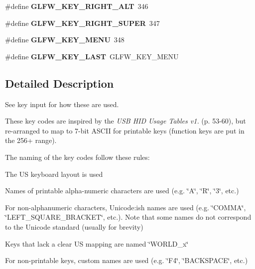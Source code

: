 \begin{DoxyCompactItemize}
\mbox{\label{group__keys_ga687b38009131cfdd07a8d05fff8fa446}} 
\#define {\bfseries G\+L\+F\+W\+\_\+\+K\+E\+Y\+\_\+\+R\+I\+G\+H\+T\+\_\+\+A\+LT}~346
\item 
\mbox{\label{group__keys_gad4547a3e8e247594acb60423fe6502db}} 
\#define {\bfseries G\+L\+F\+W\+\_\+\+K\+E\+Y\+\_\+\+R\+I\+G\+H\+T\+\_\+\+S\+U\+P\+ER}~347
\item 
\mbox{\label{group__keys_ga9845be48a745fc232045c9ec174d8820}} 
\#define {\bfseries G\+L\+F\+W\+\_\+\+K\+E\+Y\+\_\+\+M\+E\+NU}~348
\item 
\mbox{\label{group__keys_ga442cbaef7bfb9a4ba13594dd7fbf2789}} 
\#define {\bfseries G\+L\+F\+W\+\_\+\+K\+E\+Y\+\_\+\+L\+A\+ST}~G\+L\+F\+W\+\_\+\+K\+E\+Y\+\_\+\+M\+E\+NU
\end{DoxyCompactItemize}


\subsection{Detailed Description}
See key input for how these are used.

These key codes are inspired by the {\itshape U\+SB H\+ID Usage Tables v1.} (p. 53-\/60), but re-\/arranged to map to 7-\/bit A\+S\+C\+II for printable keys (function keys are put in the 256+ range).

The naming of the key codes follow these rules\+:
\begin{DoxyItemize}
\item The US keyboard layout is used
\item Names of printable alpha-\/numeric characters are used (e.\+g. \char`\"{}\+A\char`\"{}, \char`\"{}\+R\char`\"{}, \char`\"{}3\char`\"{}, etc.)
\item For non-\/alphanumeric characters, Unicode\+:ish names are used (e.\+g. \char`\"{}\+C\+O\+M\+M\+A\char`\"{}, \char`\"{}\+L\+E\+F\+T\+\_\+\+S\+Q\+U\+A\+R\+E\+\_\+\+B\+R\+A\+C\+K\+E\+T\char`\"{}, etc.). Note that some names do not correspond to the Unicode standard (usually for brevity)
\item Keys that lack a clear US mapping are named \char`\"{}\+W\+O\+R\+L\+D\+\_\+x\char`\"{}
\item For non-\/printable keys, custom names are used (e.\+g. \char`\"{}\+F4\char`\"{}, \char`\"{}\+B\+A\+C\+K\+S\+P\+A\+C\+E\char`\"{}, etc.) 
\end{DoxyItemize}